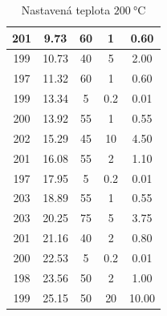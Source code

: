 \documentclass[titlepage]{article}
\begin{document}
\begin{table}[H]
\begin{minipage}{.49 \textwidth}
\begin{tabular}{c||c|c|c|c}
            201 & 9.73 & 60 & 1 & 0.60 \\ \hline
            199 & 10.73 & 40 & 5 & 2.00 \\ \hline
            197 & 11.32 & 60 & 1 & 0.60 \\ \hline
            199 & 13.34 & 5 & 0.2 & 0.01 \\ \hline
            200 & 13.92 & 55 & 1 & 0.55 \\ \hline
            202 & 15.29 & 45 & 10 & 4.50 \\ \hline
            201 & 16.08 & 55 & 2 & 1.10 \\ \hline
            197 & 17.95 & 5 & 0.2 & 0.01 \\ \hline
            203 & 18.89 & 55 & 1 & 0.55 \\ \hline
            203 & 20.25 & 75 & 5 & 3.75 \\ \hline
            201 & 21.16 & 40 & 2 & 0.80 \\ \hline
            200 & 22.53 & 5 & 0.2 & 0.01 \\ \hline
            198 & 23.56 & 50 & 2 & 1.00 \\ \hline
            199 & 25.15 & 50 & 20 & 10.00
        \end{tabular}
        \caption{Nastavená teplota $200\ \si{\celsius}$}
    \end{minipage}
\end{table}
\end{document}
